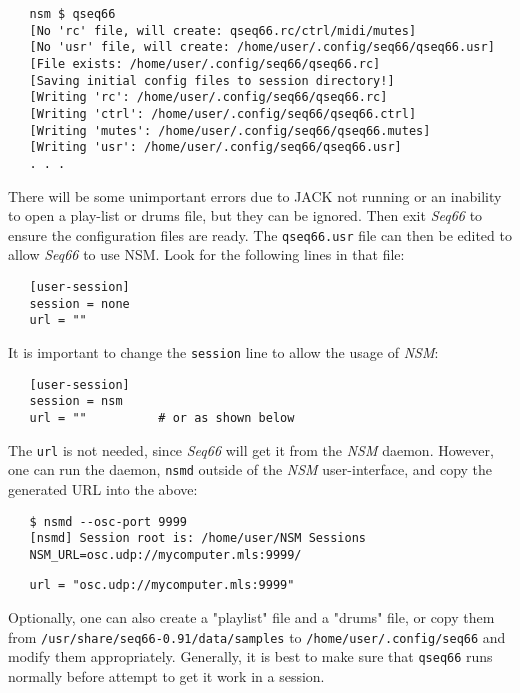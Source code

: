 \begin{verbatim}
   nsm $ qseq66 
   [No 'rc' file, will create: qseq66.rc/ctrl/midi/mutes]
   [No 'usr' file, will create: /home/user/.config/seq66/qseq66.usr]
   [File exists: /home/user/.config/seq66/qseq66.rc]
   [Saving initial config files to session directory!]
   [Writing 'rc': /home/user/.config/seq66/qseq66.rc]
   [Writing 'ctrl': /home/user/.config/seq66/qseq66.ctrl]
   [Writing 'mutes': /home/user/.config/seq66/qseq66.mutes]
   [Writing 'usr': /home/user/.config/seq66/qseq66.usr]
   . . .
\end{verbatim}

   There will be some unimportant errors due to JACK not running or an
   inability to open a play-list or drums file, but they can be ignored.
   Then exit \textsl{Seq66} to ensure the configuration files are ready.
   The \texttt{qseq66.usr} file can then be edited to allow \textsl{Seq66} to
   use NSM.  Look for the following lines in that file:

\begin{verbatim}
   [user-session]
   session = none
   url = ""
\end{verbatim}

   It is important to change the \texttt{session} line to allow the usage of
   \textsl{NSM}:

\begin{verbatim}
   [user-session]
   session = nsm
   url = ""          # or as shown below
\end{verbatim}

   The \texttt{url} is not needed, since \textsl{Seq66} will get it
   from the \textsl{NSM} daemon.  However, one can run the daemon,
   \texttt{nsmd} outside of the \textsl{NSM} user-interface, and copy the
   generated URL into the above:

\begin{verbatim}
   $ nsmd --osc-port 9999
   [nsmd] Session root is: /home/user/NSM Sessions
   NSM_URL=osc.udp://mycomputer.mls:9999/
\end{verbatim}

\begin{verbatim}
   url = "osc.udp://mycomputer.mls:9999"
\end{verbatim}

   Optionally, one can also create a "playlist" file and a "drums" file, or
   copy them from \texttt{/usr/share/seq66-0.91/data/samples} to
   \texttt{/home/user/.config/seq66} and modify them appropriately.
   Generally, it is best to make sure that \texttt{qseq66} runs normally before
   attempt to get it work in a session.

